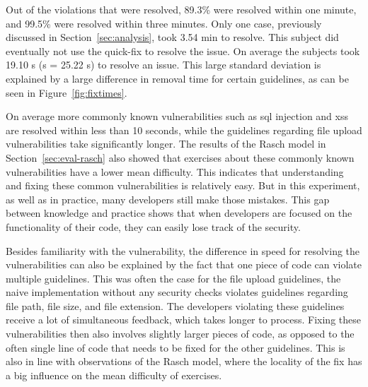 Out of the violations that were resolved, 89.3\% were resolved within one minute, and 99.5\% were resolved within three minutes.
Only one case, previously discussed in Section~\ref{sec:analysis}, took 3.54 min to resolve.
This subject did eventually not use the quick-fix to resolve the issue.
On average the subjects took 19.10 s (s = 25.22 s) to resolve an issue.
This large standard deviation is explained by a large difference in removal time for certain guidelines, as can be seen in Figure~\ref{fig:fixtimes}.

On average more commonly known vulnerabilities such as \gls{sql} injection and \gls{xss} are resolved within less than 10 seconds, while the guidelines regarding file upload vulnerabilities take significantly longer.
The results of the Rasch model in Section~\ref{sec:eval-rasch} also showed that exercises about these commonly known vulnerabilities have a lower mean difficulty.
This indicates that understanding and fixing these common vulnerabilities is relatively easy.
But in this experiment, as well as in practice, many developers still make those mistakes.
This  gap between knowledge and practice shows that when developers are focused on the functionality of their code, they can easily lose track of the security.

Besides familiarity with the vulnerability, the difference in speed for resolving the vulnerabilities can also be explained by the fact that one piece of code can violate multiple guidelines.
This was often the case for the file upload guidelines, the naive implementation without any security checks violates guidelines regarding file path, file size, and file extension.
The developers violating these guidelines receive a lot of simultaneous feedback, which takes longer to process.
Fixing these vulnerabilities then also involves slightly larger pieces of code, as opposed to the often single line of code that needs to be fixed for the other guidelines.
This is also in line with observations of the Rasch model, where the locality of the fix has a big influence on the mean difficulty of exercises.

